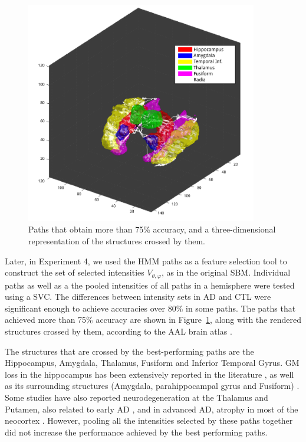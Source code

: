 \begin{figure}
	\begin{center}
		\includegraphics[width=0.9\textwidth]{Graphics/ch6/radia&structures}
		\caption{Paths that obtain more than 75\% accuracy, and a three-dimensional representation of the structures crossed by them.}
		\label{fig:bestPaths}
	\end{center}
\end{figure}

Later, in Experiment 4, we used the \ac{HMM} paths as a feature selection tool to construct the set of selected intensities $V_{\theta,\varphi}$, as in the original \ac{SBM}. Individual paths as well as a the pooled intensities of all paths in a hemisphere were tested using a \ac{SVC}. The differences between intensity sets in \ac{AD} and \ac{CTL} were significant enough to achieve accuracies over 80\% in some paths. The paths that achieved more than 75\% accuracy are shown in Figure~\ref{fig:bestPaths}, along with the rendered structures crossed by them, according to the \ac{AAL} brain atlas \cite{Tzourio-Mazoyer2002}. 

The structures that are crossed by the best-performing paths are the Hippocampus, Amygdala, Thalamus, Fusiform and Inferior Temporal Gyrus. \ac{GM} loss in the hippocampus has been extensively reported in the literature \cite{Dubois2007,Baron2001,Jong2008}, as well as its surrounding structures (Amygdala, parahippocampal gyrus and Fusiform) \cite{Baron2001}. Some studies have also reported neurodegeneration at the Thalamus and Putamen, also related to early \ac{AD} \cite{Jong2008}, and in advanced \ac{AD}, atrophy in most of the neocortex \cite{Dubois2007,Baron2001,Jong2008}. However, pooling all the intensities selected by these paths together did not increase the performance achieved by the best performing paths. 

